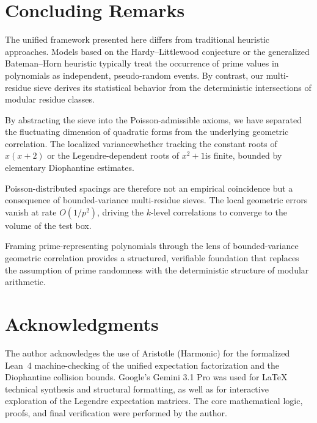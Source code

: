 \documentclass{amsart}
\theoremstyle{definition}
\theoremstyle{remark}
\numberwithin{equation}{section}
\begin{document}
\section{Concluding Remarks} \label{sec:conclusion}

The unified framework presented here differs from traditional heuristic approaches. Models based
on the Hardy--Littlewood conjecture \cite{hardy1923} or the generalized Bateman--Horn heuristic
\cite{bateman1962} typically treat the occurrence of prime values in polynomials as independent,
pseudo-random events. By contrast, our multi-residue sieve derives its statistical behavior from
the deterministic intersections of modular residue classes. 

By abstracting the sieve into the Poisson-admissible axioms, we have separated the fluctuating
dimension of quadratic forms from the underlying geometric correlation. The localized
variance\textemdash whether tracking the constant roots of $x(x+2)$ or the Legendre-dependent
roots of $x^2+1$\textemdash is finite, bounded by elementary Diophantine estimates.

Poisson-distributed spacings are therefore not an empirical coincidence but a consequence of
bounded-variance multi-residue sieves. The local geometric errors vanish at rate $O(1/p^2)$,
driving the $k$-level correlations to converge to the volume of the test box. 

Framing prime-representing polynomials through the lens of bounded-variance geometric correlation
provides a structured, verifiable foundation that replaces the assumption of prime randomness
with the deterministic structure of modular arithmetic.

\section*{Acknowledgments}
The author acknowledges the use of Aristotle (Harmonic) for the formalized Lean~4
machine-checking of the unified expectation factorization and the Diophantine collision bounds.
Google's Gemini 3.1 Pro was used for LaTeX technical synthesis and structural formatting, as well
as for interactive exploration of the Legendre expectation matrices. The core mathematical logic,
proofs, and final verification were performed by the author.


\end{document}
